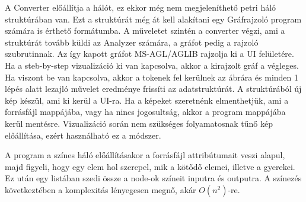 A Converter előállítja a hálót, ez ekkor még nem megjeleníthető petri háló struktúrában van. Ezt a struktúrát még át kell alakítani egy Gráfrajzoló program számára is érthető formátumba. A műveletet szintén a converter végzi, ami a struktúrát tovább küldi az Analyzer számára, a gráfot pedig a rajzoló szubrutinnak. Az így kapott gráfot MS-AGL/AGLIB rajzolja ki a UI felületére. Ha a steb-by-step vizualizáció ki van kapcsolva, akkor a kirajzolt gráf a végleges. Ha viszont be van kapcsolva, akkor a tokenek fel kerülnek az ábrára és minden 1 lépés alatt lezajló művelet eredménye frissíti az adatstruktúrát. A struktúrából új kép készül, ami ki kerül a UI-ra. Ha a képeket szeretnénk elmenthetjük, ami a forrásfájl mappájába, vagy ha nincs jogosultság, akkor a program mappájába kerül mentésre. Vizualizáció során nem szükséges folyamatosnak tűnő kép előállítása, ezért használható ez a módszer. 

A program a színes háló előállításakor a forrásfájl attribútumait veszi alapul, majd figyeli, hogy egy elem hol szerepel, mik a kötődő elemei, illetve a gyerekei. Ez után egy listában szedi össze a node-ok színeit inputra és outputra. A színezés következtében a komplexitás lényegesen megnő, akár $O(n^2)$-re.

